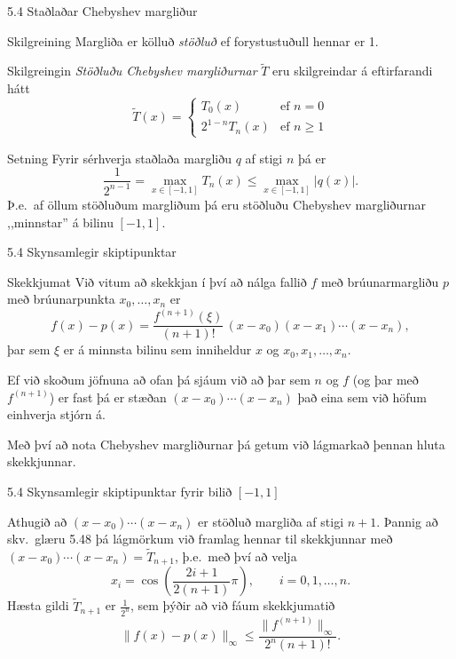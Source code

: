 \begin{frame}{5.4 Staðlaðar Chebyshev margliður}
 \begin{block}{Skilgreining}
  Margliða er kölluð \emph{stöðluð} ef forystustuðull hennar er 1.
 \end{block}
 \pause
 \begin{block}{Skilgreingin}
  \emph{Stöðluðu Chebyshev margliðurnar} $\tilde T$ eru skilgreindar á eftirfarandi hátt
  $$
    \tilde T(x) = 
    \begin{cases} 
      T_0(x) & \text{ef } n = 0 \\
      2^{1-n}T_n(x)   & \text{ef } n\geq 1      %
        \end{cases}
   $$
 \end{block}
 \pause
 \begin{block}{Setning}
  Fyrir sérhverja staðlaða margliðu $q$ af stigi $n$ þá er 
  $$
    \frac 1{2^{n-1}} = \max_{x\in [-1,1]} T_n(x) \leq \max_{x\in[-1,1]} |q(x)|.
  $$
  \pause
  Þ.e.~af öllum stöðluðum margliðum þá eru stöðluðu Chebyshev margliðurnar ,,minnstar'' 
  á bilinu $[-1,1]$.
 \end{block}
\end{frame}

\begin{frame}{5.4 Skynsamlegir skiptipunktar}
\begin{block}{Skekkjumat}
  Við vitum að skekkjan í því að nálga fallið $f$ með brúunarmargliðu $p$
  með brúunarpunkta $x_0,\ldots,x_n$ er
  $$
    f(x)-p(x) = \frac{f^{(n+1)}(\xi)}{(n+1)!}\, (x-x_0)(x-x_1)\cdots (x-x_n),
  $$
  þar sem $\xi$ er á minnsta bilinu sem inniheldur $x$ og $x_0,x_1,\ldots,x_n$. 
\end{block} \pause
\begin{block}{}
 Ef við skoðum jöfnuna að ofan þá sjáum við að þar sem $n$ og $f$ (og þar með $f^{(n+1)}$) er fast
 þá er stæðan $(x-x_0)\cdots(x-x_n)$ það eina sem við höfum einhverja stjórn á. \pause
 
 Með því að nota Chebyshev margliðurnar þá getum við lágmarkað þennan hluta skekkjunnar.
\end{block}

\end{frame}
  
\begin{frame}{5.4 Skynsamlegir skiptipunktar fyrir bilið $[-1,1]$}

\begin{block}{}
Athugið að $(x-x_0)\cdots (x-x_n)$ er stöðluð margliða af stigi $n+1$. Þannig að skv.~glæru 5.48 
þá lágmörkum við  framlag hennar til skekkjunnar með $(x-x_0)\cdots (x-x_n) = \tilde T_{n+1}$, \pause
þ.e.~með því að velja 
$$
x_i = \cos\left(\frac{2i+1}{2(n+1)}\pi\right), \qquad i=0,1,\ldots,n.
$$
\pause 
Hæsta gildi $\tilde T_{n+1}$ er $\frac 1{2^n}$, sem þýðir að við fáum skekkjumatið
$$
\|f(x)-p(x)\|_\infty \leq \frac{\|f^{(n+1)}\|_\infty}{2^n(n+1)!}.
$$
\end{block}
\end{frame} 


